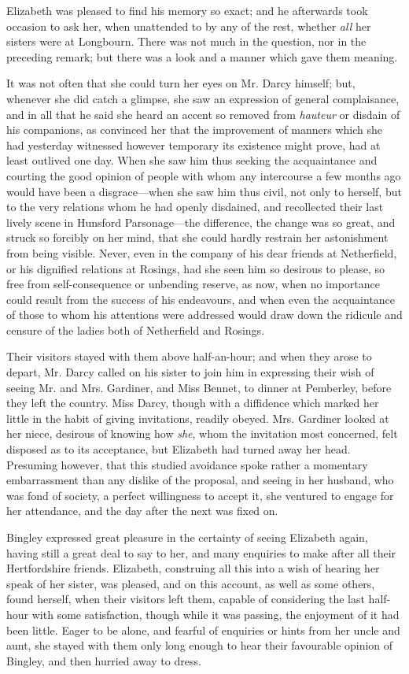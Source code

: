 Elizabeth was pleased to find his memory so exact; and he afterwards took occasion to ask her, when unattended to by any of the rest, whether {\em all} her sisters were at Longbourn. There was not much in the question, nor in the preceding remark; but there was a look and a manner which gave them meaning.

It was not often that she could turn her eyes on Mr. Darcy himself; but, whenever she did catch a glimpse, she saw an expression of general complaisance, and in all that he said she heard an accent so removed from {\em hauteur} or disdain of his companions, as convinced her that the improvement of manners which she had yesterday witnessed however temporary its existence might prove, had at least outlived one day. When she saw him thus seeking the acquaintance and courting the good opinion of people with whom any intercourse a few months ago would have been a disgrace---when she saw him thus civil, not only to herself, but to the very relations whom he had openly disdained, and recollected their last lively scene in Hunsford Parsonage---the difference, the change was so great, and struck so forcibly on her mind, that she could hardly restrain her astonishment from being visible. Never, even in the company of his dear friends at Netherfield, or his dignified relations at Rosings, had she seen him so desirous to please, so free from self-consequence or unbending reserve, as now, when no importance could result from the success of his endeavours, and when even the acquaintance of those to whom his attentions were addressed would draw down the ridicule and censure of the ladies both of Netherfield and Rosings.

Their visitors stayed with them above half-an-hour; and when they arose to depart, Mr. Darcy called on his sister to join him in expressing their wish of seeing Mr. and Mrs. Gardiner, and Miss Bennet, to dinner at Pemberley, before they left the country. Miss Darcy, though with a diffidence which marked her little in the habit of giving invitations, readily obeyed. Mrs. Gardiner looked at her niece, desirous of knowing how {\em she}, whom the invitation most concerned, felt disposed as to its acceptance, but Elizabeth had turned away her head. Presuming however, that this studied avoidance spoke rather a momentary embarrassment than any dislike of the proposal, and seeing in her husband, who was fond of society, a perfect willingness to accept it, she ventured to engage for her attendance, and the day after the next was fixed on.

Bingley expressed great pleasure in the certainty of seeing Elizabeth again, having still a great deal to say to her, and many enquiries to make after all their Hertfordshire friends. Elizabeth, construing all this into a wish of hearing her speak of her sister, was pleased, and on this account, as well as some others, found herself, when their visitors left them, capable of considering the last half-hour with some satisfaction, though while it was passing, the enjoyment of it had been little. Eager to be alone, and fearful of enquiries or hints from her uncle and aunt, she stayed with them only long enough to hear their favourable opinion of Bingley, and then hurried away to dress.


